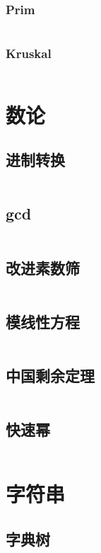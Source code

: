 \documentclass[a4paper,11pt]{article}
\begin{document}
\subsubsection{Prim} 
\inputminted[breaklines]{c++}{graph/prim.cpp}
\subsubsection{Kruskal} 
\inputminted[breaklines]{c++}{graph/kruskal.cpp}



\section{数论}
\subsection{进制转换}
\inputminted[breaklines]{c++}{number_theory/base_conversion.cpp}
\subsection{gcd}
\inputminted[breaklines]{c++}{number_theory/gcd.cpp}
\subsection{改进素数筛}
\inputminted[breaklines]{c++}{number_theory/prime.cpp}
\subsection{模线性方程}
\inputminted[breaklines]{c++}{number_theory/modequ.cpp}

\subsection{中国剩余定理}
\inputminted[breaklines]{c++}{number_theory/china.cpp}
\subsection{快速幂}
\inputminted[breaklines]{c++}{number_theory/pow_mod.cpp}





\section{字符串}
\subsection{字典树}
\inputminted[breaklines]{c++}{string/trie.cpp}
\end{document}
